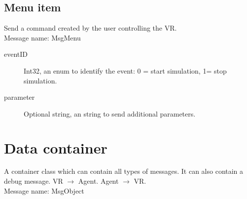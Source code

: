 \documentclass[a4paper,10pt]{scrartcl}
\begin{document}
\subsection{Menu item}
Send a command created by the user controlling the VR.\\
Message name: MsgMenu
\begin{description}
 \item [eventID] Int32, an enum to identify the event: 0 = start simulation, 1= stop simulation.
 \item [parameter] Optional string, an string to send additional parameters.
\end{description}


\newpage


\section{Data container}
A container class which can contain all types of messages. It can also contain a debug message.
VR $\rightarrow$ Agent. Agent $\rightarrow$ VR.\\
Message name: MsgObject
\end{document}
